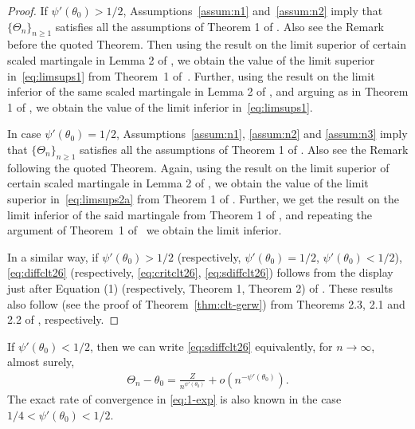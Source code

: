 \documentclass[12pt]{amsart}
\theoremstyle{plain}
\theoremstyle{remark}
\numberwithin{equation}{section}
\begin{document}
\begin{proof}
    If  $\psi'(\theta_0) > 1/2$, Assumptions~\ref{assum:n1} and~\ref{assum:n2} imply that $\{{\Theta}_n\}_{n \geq 1}$ satisfies all the assumptions of Theorem 1 of \cite{gaposkin1975law}. Also see the Remark before the quoted Theorem. Then using the result on the limit superior of certain scaled martingale in Lemma 2 of \cite{gaposkin1975law}, we obtain the value of the limit superior in~\eqref{eq:limsups1} from Theorem~1 of~\cite{gaposkin1975law}. %
Further, using the result on the limit inferior of the same scaled martingale in Lemma 2 of \cite{gaposkin1975law}, and arguing as in Theorem 1 of \cite{gaposkin1975law}, we obtain the value of the limit inferior in~\eqref{eq:limsups1}. %

In case $\psi'(\theta_0) = 1/2$, Assumptions~\ref{assum:n1}, \ref{assum:n2} and \ref{assum:n3} imply that $\{{\Theta}_n\}_{n \geq 1}$ satisfies all the assumptions of Theorem 1 of \cite{krasulina1996estimate}. Also see the Remark following the quoted Theorem. Again, using the result on the limit superior of certain scaled martingale in Lemma 2 of \cite{krasulina1996estimate}, we obtain the value of the limit superior in~\eqref{eq:limsups2a} from Theorem 1 of \cite{krasulina1996estimate}. %
Further, we get the result on the limit inferior of the said martingale from Theorem 1 of \cite{heyde}, and repeating the argument of Theorem~1 of~\cite{krasulina1996estimate} we obtain the limit inferior. %

{In a similar way, if $\psi'(\theta_0) > 1/2$ (respectively, $\psi'(\theta_0) = 1/2$, $\psi'(\theta_0) < 1/2$), \eqref{eq:diffclt26} (respectively, \eqref{eq:critclt26}, \eqref{eq:sdiffclt26}) follows from the display just after Equation (1) (respectively, Theorem 1, Theorem 2) of \cite{major1973limit}. These results also follow (see the proof of Theorem~\ref{thm:clt-gerw}) from Theorems 2.3, 2.1 and 2.2 of \cite{zhang2016central}, respectively.}
\end{proof}

If $\psi'(\theta_0) < 1/2$, then we can write \eqref{eq:sdiffclt26} equivalently, for $n\to\infty$, almost surely,
\begin{align}\label{eq:1-exp}
    {\Theta_n} - {\theta}_0 = \frac{Z}{n^{\psi'(\theta_0)}} + o\left(n^{-\psi'(\theta_0)}\right).
\end{align}
The exact rate of convergence in \eqref{eq:1-exp} is also known in the case $1/4 < \psi'(\theta_0) < 1/2$. 
\end{document}
